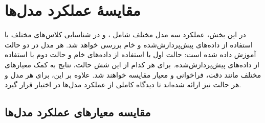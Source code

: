 \section{مقایسهٔ عملکرد مدل‌ها}

در این بخش، عملکرد سه مدل مختلف شامل ،  و  در شناسایی کلاس‌های مختلف با استفاده از داده‌های پیش‌پردازش‌شده و خام بررسی خواهد شد. هر مدل در دو حالت آموزش داده شده است: حالت اول با استفاده از داده‌های خام و حالت دوم با استفاده از داده‌های پیش‌پردازش‌شده. برای هر کدام از این شش حالت، نتایج به کمک معیارهای مختلف مانند دقت، فراخوانی و معیار  مقایسه خواهند شد. علاوه بر این،  برای هر مدل و هر حالت نیز ارائه شده‌اند تا دیدگاه کاملی از عملکرد مدل‌ها در اختیار قرار گیرد.

\subsection{مقایسه معیارهای عملکرد مدل‌ها}

\begin{table}[H]
\centering
\renewcommand{\arraystretch}{0.8} %
\scriptsize %
\caption{مقایسهٔ عملکرد مدل‌های مختلف در داده‌های خام و پیش‌پردازش‌شده}
\label{tab:comparison-models}
\end{table}


